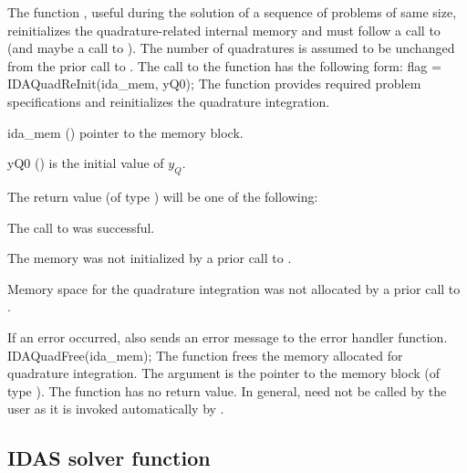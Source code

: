 {The function , useful during the solution of a
sequence of problems of same size, reinitializes the quadrature-related
internal memory and must follow a call to  (and maybe
a call to ).  The number  of quadratures is
assumed to be unchanged from the prior call to .  The
call to the  function has the following form:
{
  flag = IDAQuadReInit(ida\_mem, yQ0);
}
{
  The function  provides required problem specifications
  and reinitializes the quadrature integration.
}
{
  \begin{args}
  \item[ida\_mem] ()
    pointer to the {\idas} memory block.
  \item[yQ0] ()
    is the initial value of $y_Q$.
  \end{args}
}
{
  The return value  (of type ) will be one of the following:
  \begin{args}
  \item[\Id{IDA\_SUCCESS}]
    The call to  was successful.
  \item[\Id{IDA\_MEM\_NULL}]
    The {\idas} memory was not initialized by a prior call to .
  \item[\Id{IDA\_NO\_QUAD}]
    Memory space for the quadrature integration was not allocated by a prior
    call to .
  \end{args}
}
{
  If an error occurred,  also sends an error message to the
  error handler function.
}
{
  IDAQuadFree(ida\_mem);
}
{
  The function  frees the memory allocated for quadrature integration.
}
{
  The argument is the pointer to the {\idas} memory block (of type ).
}
{
  The function  has no return value.
}
{
  In general,  need not be called by the user as it is
  invoked automatically by .
}


\subsection{IDAS solver function}

}
